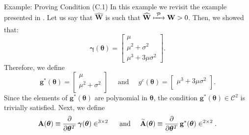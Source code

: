 \documentclass[envcountsect,usenames,dvipsnames]{beamer}
\def\btheta{\bm \theta}
\def\bgamma{\bm \gamma}
\def\g{\mathbf{g}}
\def\W{\mathbf{W}}
\theoremstyle{mystyle}
\begin{document}
\begin{frame}{Example: Proving Condition {\color{beamer@UIUCblue}(C.1)}}
\small
In this example we revisit the example presented in \hyperlink{exampleGMM}{}. Let us say that $\widehat{\W}$ is such that $\widehat{\W} \xmapsto[\;\;\;\;\; ]{\mathcal{P}} \W > 0$. Then, we showed that:
%
\begin{equation*}
		\bgamma(\btheta) = 	\begin{bmatrix}
			 \mu\\
			\mu^2 + \sigma^2\\
			\mu^3 + 3 \mu \sigma^2
	 		 \end{bmatrix}.
\end{equation*}
%
Therefore, we define
%
\begin{equation*}
    \g^*(\btheta) = \begin{bmatrix}
			 \mu\\
			\mu^2 + \sigma^2\\
	 		 \end{bmatrix}
	 		 \;\;\;\;\; \text{and} \;\;\;\;\; g^c(\btheta) = \begin{bmatrix}
			 \mu^3 + 3 \mu \sigma^2\\
	 		 \end{bmatrix}.
\end{equation*}
%
Since the elements of $\g^*(\btheta)$ are polynomial in $\btheta$, the condition $\g^*(\btheta) \in \mathcal{C}^2$ is trivially satisfied. Next, we define
%
\begin{equation*}
    \mathbf{A} (\bm{\btheta}) \equiv \frac{\partial}{\partial \bm{\theta}^T}\, \bgamma(\btheta) \in \real^{3 \times 2} \;\;\;\;\; \text{and}  \;\;\;\;\; \widetilde{\mathbf{A}} (\bm{\btheta}) \equiv \frac{\partial}{\partial \bm{\theta}^T}\, \g^*(\btheta) \in \real^{2 \times 2}.
\end{equation*}
\end{frame}
\end{document}
